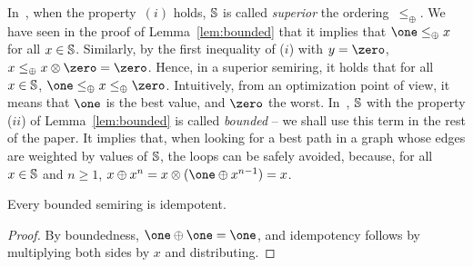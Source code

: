 In~\cite{Huang08advanceddynamic}, when the property~$(i)$ holds,
$\mathbb{S}$ is called \emph{superior} \wrt the ordering~$\leq_\oplus$.
We have seen in the proof of Lemma~\ref{lem:bounded} that it implies that
$\one \leq_\oplus x$ for all $x \in \mathbb{S}$.
Similarly, by the first inequality of ($i$) with $y = \zero$,
$x \leq_\oplus x \otimes \zero = \zero$.
%
Hence, in a superior semiring, %
it holds that %
for all $x \in \mathbb{S}$, $\one \leq_\oplus x \leq_\oplus \zero$.
%
Intuitively, from an optimization point of view,
it means that $\one$ is the best value, and $\zero$ the worst.
%
In~\cite{Mohri02semiring},
$\mathbb{S}$ with the property ($ii$) of Lemma~\ref{lem:bounded}
is called \emph{bounded} -- we shall use this term in the rest of the paper.
It implies that, when looking for a best path in a graph whose edges
are weighted by values of $\mathbb{S}$, the loops can be safely avoided,
because, for all $x \in \mathbb{S}$ and $n \geq 1$,
 $x \oplus x^n = x \otimes (\one \oplus x^{n-1}) = x$.


\begin{lemma}
Every bounded semiring is idempotent.
\end{lemma}
\begin{proof}
By boundedness, $\one \oplus \one = \one$,
and idempotency follows by multiplying
both sides by $x$ and distributing.
\end{proof}

